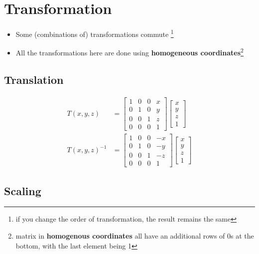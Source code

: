 \chapter{Transformation}

\begin{itemize}
  \item Some (combinations of) transformations commute
  \footnote{if you change the order of transformation, the result remains the
  same}
  \item All the transformations here are done using \textbf{homogeneous
  coordinates}\footnote{matrix in \textbf{homogenous coordinates} all have
  an additional rows of 0s at the bottom, with the last element being 1}
\end{itemize}

\section{Translation}

  \begin{align}
    T\left( x, y, z \right) &=
    \begin{bmatrix}
      1 & 0 & 0 & x \\
      0 & 1 & 0 & y \\
      0 & 0 & 1 & z \\
      0 & 0 & 0 & 1
    \end{bmatrix}
    \begin{bmatrix}
      x \\
      y \\
      z \\
      1
    \end{bmatrix} \\
    T\left( x, y, z \right)^{-1} &=
    \begin{bmatrix}
      1 & 0 & 0 & -x \\
      0 & 1 & 0 & -y \\
      0 & 0 & 1 & -z \\
      0 & 0 & 0 & 1
    \end{bmatrix}
    \begin{bmatrix}
      x \\
      y \\
      z \\
      1
    \end{bmatrix}
  \end{align}

\section{Scaling}

